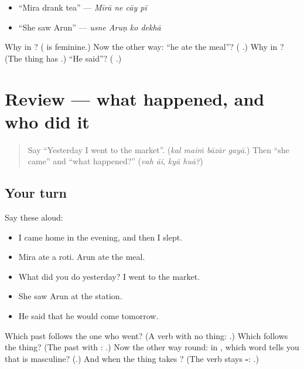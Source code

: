 \begin{itemize}
\raggedright
  \item \textquotedblleft{}Mira drank tea\textquotedblright{} — \emph{Mīrā ne cāy pī}
  \item \textquotedblleft{}She saw Arun\textquotedblright{} — \emph{usne Aruṇ ko dekhā}
\end{itemize}

\begin{tcolorbox}[breakable,colback=teal!4,colframe=teal!35!black,title={Before you move on}]
Why \textbf{} in \textbf{  }? (\textbf{} is feminine.) Now the other way: \textquotedblleft{}he ate the meal\textquotedblright{}? (\textbf{  }.) Why \textbf{} in \textbf{   }? (The thing has \textbf{}.) \textquotedblleft{}He said\textquotedblright{}? (\textbf{ }.)
\end{tcolorbox}
\section[(review)]{Review — what happened, and who did it}

\label{lesson:HI-R276-what-happened}



\begin{quote}
Say \textquotedblleft{}Yesterday I went to the market\textquotedblright{}. (\emph{kal maiṁ bāzār gayā}.) Then \textquotedblleft{}she came\textquotedblright{} and \textquotedblleft{}what happened?\textquotedblright{} (\emph{vah āī}, \emph{kyā huā?})
\end{quote}

\subsection*{Your turn}
Say these aloud:

\begin{itemize}
\raggedright
  \item I came home in the evening, and then I slept.
  \item Mira ate a roti. Arun ate the meal.
  \item What did you do yesterday? I went to the market.
  \item She saw Arun at the station.
  \item He said that he would come tomorrow.
\end{itemize}

\begin{tcolorbox}[breakable,colback=teal!4,colframe=teal!35!black,title={Before you move on}]
Which past follows the one who went? (A verb with no thing: \textbf{ }.) Which follows the thing? (The past with \textbf{}: \textbf{   }.) Now the other way round: in \textbf{  }, which word tells you that \textbf{} is masculine? (\textbf{}.) And when the thing takes \textbf{}? (The verb stays \textbf{-}: \textbf{   }.)
\end{tcolorbox}
